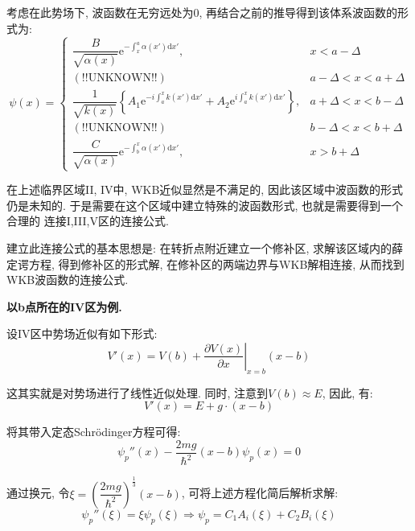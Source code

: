 \documentclass[a4paper, 11pt]{article}
\begin{document}
\begin{spacing}{1.2}
          考虑在此势场下, 波函数在无穷远处为0, 再结合之前的推导得到该体系波函数的形式为:
          \begin{equation}
            \psi(x) = \left\{\begin{array}{ll}
              \dfrac{B}{\sqrt{\alpha(x)}}\mathrm{e}^{-\int_x^a\alpha(x')\mathrm{d}x'}, & x<a-\Delta\\
              \mathrm{(!!UNKNOWN!!)} & a-\Delta<x<a+\Delta\\
              \dfrac{1}{\sqrt{k(x)}}\left\{A_1\mathrm{e}^{-i\int_a^xk(x')\mathrm{d}x'} + %
                A_2\mathrm{e}^{i\int_a^xk(x')\mathrm{d}x'}\right\}, &  a+\Delta<x<b-\Delta\\
              \mathrm{(!!UNKNOWN!!)} & b-\Delta<x<b+\Delta\\
              \dfrac{C}{\sqrt{\alpha(x)}}\mathrm{e}^{-\int_b^x\alpha(x')\mathrm{d}x'}, & x>b+\Delta              
            \end{array}\right.
          \end{equation}

          在上述临界区域II, IV中, WKB近似显然是不满足的, 因此该区域中波函数的形式仍是未知的. 
          于是需要在这个区域中建立特殊的波函数形式, 也就是需要得到一个合理的 
          连接I,III,V区的连接公式. 
          
          建立此连接公式的基本思想是: 在转折点附近建立一个修补区, 求解该区域内的薛定谔方程,
          得到修补区的形式解, 在修补区的两端边界与WKB解相连接, 从而找到WKB波函数的连接公式. 
          
          \textbf{以b点所在的IV区为例.} 

          设IV区中势场近似有如下形式:
          \begin{equation}
            V'(x) = V(b)+\left.\dfrac{\partial{}V(x)}{\partial{}x}\right|_{x=b}(x-b) 
          \end{equation}

          这其实就是对势场进行了线性近似处理. 
          同时, 注意到$V(b)\approx{}E$, 因此, 有:
          \begin{equation}
            V'(x) = E + g\cdot(x-b)
          \end{equation}

          将其带入定态Schr\"odinger方程可得:
          \begin{equation}
            \psi_p''(x) - \dfrac{2mg}{\hbar^2}(x-b)\psi_p(x) = 0
          \end{equation}

          通过换元, 令$\xi = \left(\dfrac{2mg}{\hbar^2}\right)^{\frac{1}{3}}(x-b)$, 可将上述方程化简后解析求解: 
          \begin{equation}
            \psi_p''(\xi) = \xi\psi_p(\xi) \Longrightarrow \psi_p = C_1A_i(\xi) + C_2B_i(\xi)
          \end{equation}


\end{spacing}
\end{document}
